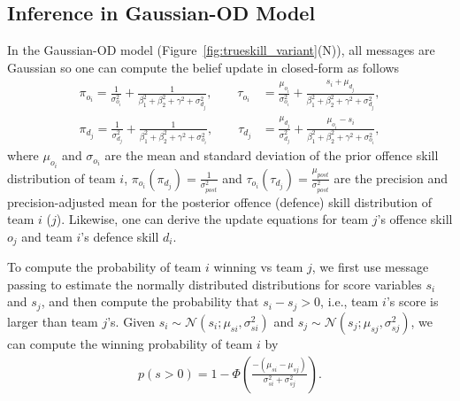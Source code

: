 
\subsection{Inference in Gaussian-OD Model}

 In the Gaussian-OD model
(Figure~\ref{fig:trueskill_variant}(N)), all
messages are Gaussian so one can
compute the belief update in closed-form as follows
\begin{align}
\label{eq:GaussianGraphicalModelsUpdatingEquation}
  \pi_{o_{i}}  =    \frac{1}{\sigma_{o_{i}}^2} + \frac{1}{\beta_1^2+\beta_2^2+\gamma^2+\sigma_{d_{j}}^2}, \qquad \tau_{o_{i}}    &=    \frac{\mu_{o_{i}}}{\sigma_{o_{i}}^2} + \frac{s_i+\mu_{d_{j}}}{\beta_1^2+\beta_2^2+\gamma^2+\sigma_{d_{j}}^2},  \nonumber \\
  \pi_{d_{j}}  =    \frac{1}{\sigma_{d_{j}}^2} + \frac{1}{\beta_1^2+\beta_2^2+\gamma^2+\sigma_{o_{i}}^2}, \qquad \tau_{d_{j}}    &=    \frac{\mu_{d_{j}}}{\sigma_{d_{j}}^2} + \frac{\mu_{o_{i}}-s_i}{\beta_1^2+\beta_2^2+\gamma^2+\sigma_{o_{i}}^2},
\end{align}
\unindentmore where $\mu_{o_{i}}$ and $\sigma_{o_{i}}$ are the mean
and standard deviation of the prior offence skill distribution of team
$i$, $\pi_{o_{i}} (\pi_{d_{j}}) = \frac{1}{\sigma_{\mathit{post}}^2}$
and $\tau_{o_{i}} (\tau_{d_{j}}) =
\frac{\mu_{\mathit{post}}}{\sigma_{\mathit{post}}^2}$ are the
precision and precision-adjusted mean for the posterior offence
(defence) skill distribution of team $i$ ($j$).  Likewise, one can
derive the update equations for team $j$'s offence skill $o_j$ and
team $i$'s defence skill $d_i$.

 To compute
the probability of team $i$ winning vs team $j$, we first use message
passing to estimate the normally distributed distributions for score
variables $s_i$ and $s_j$, and then compute the probability that
$s_i-s_j>0$, i.e., team $i$'s score is larger than team $j$'s. Given
$s_i\sim\mathcal{N}(s_i;\mu_{si},\sigma_{si}^2)$ and
$s_j\sim\mathcal{N}(s_j;\mu_{sj},\sigma_{sj}^2)$, we can compute the
winning probability of team $i$ by
\begin{align}
  p(s>0) = 1 - \Phi\left(\frac{-(\mu_{si}-\mu_{sj})}{\sigma_{si}^2+\sigma_{sj}^2}\right).
\end{align}

